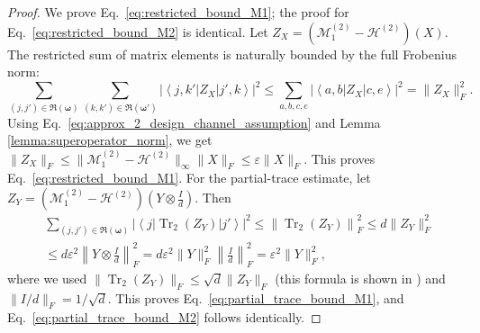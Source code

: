 \documentclass[%
 reprint,
 amsmath,amssymb,
 aps,
 pra,
]{revtex4-2}
\theoremstyle{definition}
\begin{document}
\begin{proof}
We prove Eq.~\eqref{eq:restricted_bound_M1}; the proof for Eq.~\eqref{eq:restricted_bound_M2} is identical. Let $Z_X = (\mathcal M^{(2)}_1-\mathcal H^{(2)})(X)$. The restricted sum of matrix elements is naturally bounded by the full Frobenius norm:
\begin{equation}
\sum_{(j,j')\in\mathfrak R(\bm{\omega})}
\sum_{(k,k')\in\mathfrak R(\bm{\omega}')}
\left|
\left\langle j,k'\right|
Z_X
\left|j',k\right\rangle
\right|^2
\leq
\sum_{a,b,c,e}
\left|
\left\langle a,b\right|
Z_X
\left|c,e\right\rangle
\right|^2
=
\|Z_X\|_F^2.
\end{equation}
Using Eq.~\eqref{eq:approx_2_design_channel_assumption} and Lemma \ref{lemma:superoperator_norm}, we get $\|Z_X\|_F \leq \|\mathcal M^{(2)}_1-\mathcal H^{(2)}\|_{\infty} \|X\|_F \leq \varepsilon\|X\|_F$. This proves Eq.~\eqref{eq:restricted_bound_M1}. For the partial-trace estimate, let $Z_Y = (\mathcal M^{(2)}_1-\mathcal H^{(2)})(Y\otimes\frac{I}{d})$. Then
\begin{align}
&\sum_{(j,j')\in\mathfrak R(\bm{\omega})}
\left|
\left\langle j\right|
\operatorname{Tr}_2(Z_Y)
\left|j'\right\rangle
\right|^2
\leq
\left\| \operatorname{Tr}_2(Z_Y) \right\|_F^2
\leq
d\|Z_Y\|_F^2 \nonumber \\
&\leq
d\varepsilon^2
\left\| Y\otimes\frac{I}{d} \right\|_F^2
=
d\varepsilon^2 \|Y\|_F^2 \left\|\frac{I}{d}\right\|_F^2
=
\varepsilon^2\|Y\|_F^2,
\end{align}
where we used $\|\operatorname{Tr}_2(Z_Y)\|_F\leq\sqrt d\|Z_Y\|_F$ (this formula is shown in \cite[Proposition 1]{Rastegin2012}) and $\|I/d\|_F=1/\sqrt d$. This proves Eq.~\eqref{eq:partial_trace_bound_M1}, and Eq.~\eqref{eq:partial_trace_bound_M2} follows identically.
\end{proof}
\end{document}
